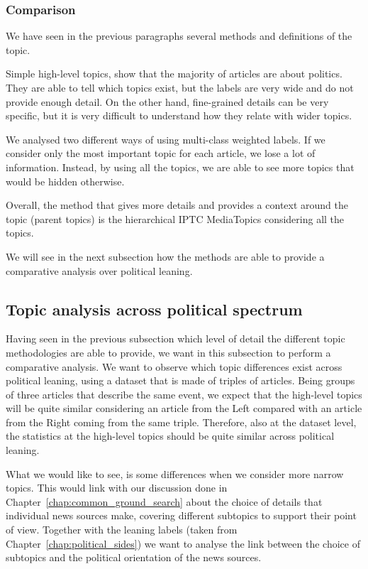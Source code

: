 \subsubsection{\statusgreen Comparison}

We have seen in the previous paragraphs several methods and definitions of the topic.

Simple high-level topics, show that the majority of articles are about politics. They are able to tell which topics exist, but the labels are very wide and do not provide enough detail.
On the other hand, fine-grained details can be very specific, but it is very difficult to understand how they relate with wider topics.

We analysed two different ways of using multi-class weighted labels. If we consider only the most important topic for each article, we lose a lot of information. Instead, by using all the topics, we are able to see more topics that would be hidden otherwise.

Overall, the method that gives more details and provides a context around the topic (parent topics) is the hierarchical IPTC MediaTopics considering all the topics.

We will see in the next subsection how the methods are able to provide a comparative analysis over political leaning.



\subsection{\statusgreen Topic analysis across political spectrum}
\label{ssec:topics_topics_leaning}

Having seen in the previous subsection which level of detail the different topic methodologies are able to provide, we want in this subsection to perform a comparative analysis.
We want to observe which topic differences exist across political leaning, using a dataset that is made of triples of articles.
Being groups of three articles that describe the same event, we expect that the high-level topics will be quite similar considering an article from the Left compared with an article from the Right coming from the same triple.
Therefore, also at the dataset level, the statistics at the high-level topics should be quite similar across political leaning.

What we would like to see, is some differences when we consider more narrow topics. This would link with our discussion done in Chapter~\ref{chap:common_ground_search} about the choice of details that individual news sources make, covering different subtopics to support their point of view.
Together with the leaning labels (taken from Chapter~\ref{chap:political_sides}) we want to analyse the link between the choice of subtopics and the political orientation of the news sources.

